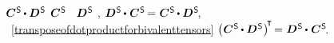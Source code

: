 \vspace{-1em}
{\small
\setlength{\parindent}{0pt}
\begin{leftverticalbar}%
%
${\bm{C}^{\mathsf{\hspace{.1ex}S}} \hspace{-0.1ex}\dotp \bm{D}^{\mathsf{\hspace{.1ex}S}}}$
${\bm{C}^{\mathsf{\hspace{.1ex}S}}}$
~${\bm{D}^{\mathsf{\hspace{.1ex}S}}}$
,
${\bm{D}^{\mathsf{\hspace{.1ex}S}} \hspace{-0.1ex}\dotp\hspace{.12ex} \bm{C}^{\mathsf{\hspace{.1ex}S}} \hspace{-0.2ex}=\hspace{.1ex} \bm{C}^{\mathsf{\hspace{.1ex}S}} \hspace{-0.1ex}\dotp \bm{D}^{\mathsf{\hspace{.1ex}S}}\hspace{-0.4ex}}$,
~\eqref{transposeofdotproductforbivalenttensors}
${\left(\hspace{.08ex} \bm{C}^{\mathsf{\hspace{.1ex}S}} \hspace{-0.1ex}\dotp \bm{D}^{\mathsf{\hspace{.1ex}S}} \hspace{.1ex}\right)^{\hspace{-0.32ex}\T} \hspace{-0.3ex} = \hspace{.1ex} \bm{D}^{\mathsf{\hspace{.1ex}S}} \hspace{-0.1ex}\dotp\hspace{.12ex} \bm{C}^{\mathsf{\hspace{.1ex}S}} \hspace{-0.4ex}}$.

\end{leftverticalbar}
\par}


